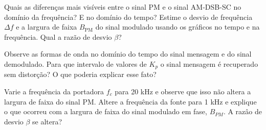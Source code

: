 \documentclass[12pt,addpoints]{exam}
\begin{document}
\begin{questions}
    \question Quais as diferenças mais visíveis entre o sinal PM e o sinal AM-DSB-SC no domínio da frequência? E no domínio do tempo?
    \fillwithlines{1.5in}
    \question Estime o desvio de frequência $\Delta f$ e a largura de faixa $B_{\text{PM}}$ do sinal modulado usando os gráficos no tempo e na frequência. Qual a razão de desvio $\beta$?
    \fillwithlines{0.75in}
    
    \question Observe as formas de onda no domínio do tempo do sinal mensagem e do sinal demodulado. Para que intervalo de valores de $K_p$ o sinal mensagem é recuperado sem distorção? O que poderia explicar esse fato?
    \fillwithlines{1.50in}

    \question Varie a frequência da portadora $f_c$ para 20 kHz e observe que isso não altera a largura de faixa do sinal PM. Altere a frequência da fonte para 1 kHz e explique o que ocorreu com a largura de faixa do sinal modulado em fase, $B_{PM}$. A razâo de desvio $\beta$ se altera?
    \fillwithlines{0.5in}
    
%    
\end{questions}
\end{document}
